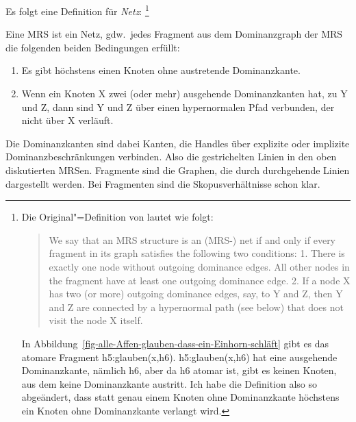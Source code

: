 Es folgt eine Definition für \emph{Netz}:
\footnote{
  Die Original"=Definition von \citet[]{FKT2005a} lautet wie folgt:
\begin{quote}
We say that an MRS structure is an (MRS-) net if and only if every fragment
in its graph satisfies the following two conditions:
1. There is exactly one node without outgoing dominance edges. All other
nodes in the fragment have at least one outgoing dominance edge.
2. If a node X has two (or more) outgoing dominance edges, say, to Y and Z,
then Y and Z are connected by a hypernormal path (see below) that does not
visit the node X itself.
\end{quote}
In Abbildung~\ref{fig-alle-Affen-glauben-dass-ein-Einhorn-schläft} gibt es das atomare Fragment
h5:glauben(x,h6). h5:glauben(x,h6) hat eine ausgehende Dominanzkante, nämlich h6, aber da h6 atomar ist, gibt es
keinen Knoten, aus dem keine Dominanzkante austritt. Ich habe die Definition also so
abgeändert, dass statt genau einem Knoten ohne Dominanzkante höchstens ein Knoten ohne Dominanzkante
verlangt wird.
}
\begin{definition}
Eine MRS ist ein Netz, gdw.\ jedes Fragment aus dem Dominanzgraph der MRS die folgenden beiden
Bedingungen erfüllt:
\begin{enumerate}
\item Es gibt höchstens einen Knoten ohne austretende Dominanzkante.
\item Wenn ein Knoten X zwei (oder mehr) ausgehende Dominanzkanten hat, \zb zu Y und Z, dann sind Y
  und Z über einen hypernormalen Pfad verbunden, der nicht über X verläuft.
\end{enumerate}
\end{definition}
Die Dominanzkanten sind dabei Kanten, die Handles über explizite oder implizite
Dominanzbeschränkungen verbinden. Also die gestrichelten Linien in den oben diskutierten
MRSen. Fragmente sind die Graphen, die durch durchgehende Linien dargestellt werden. Bei Fragmenten
sind die Skopusverhältnisse schon klar.

